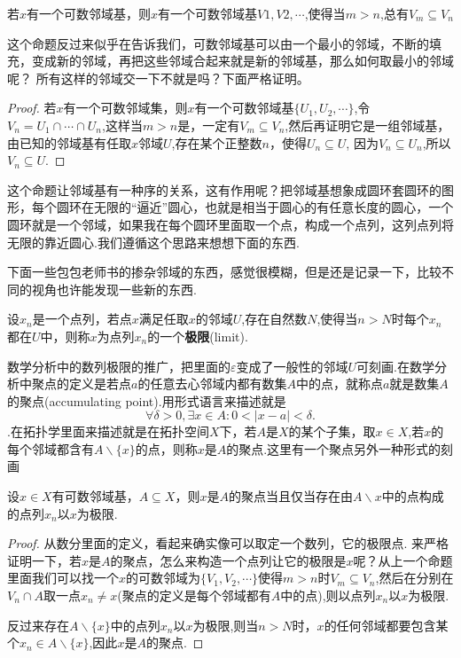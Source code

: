 \begin{proposition}
若$x$有一个可数邻域基，则$x$有一个可数邻域基${V1,V2,\cdots}$,使得当$m > n$,总有$V_m \subseteq V_n$
\end{proposition}

这个命题反过来似乎在告诉我们，可数邻域基可以由一个最小的邻域，不断的填充，变成新的邻域，再把这些邻域合起来就是新的邻域基，那么如何取最小的邻域呢？ 所有这样的邻域交一下不就是吗？下面严格证明。

\begin{proof}
若$x$有一个可数邻域集，则$x$有一个可数邻域基$\{U_1,U_2,\cdots\}$,令$V_n=U_1 \cap \cdots \cap U_n$,这样当$m>n$是，一定有$V_m \subseteq V_n$,然后再证明它是一组邻域基，由已知的邻域基有任取$x$邻域$U$,存在某个正整数$n$，使得$U_n \subseteq U$, 因为$V_n \subseteq U_n$,所以$V_n \subseteq U$.
\end{proof}

这个命题让邻域基有一种序的关系，这有作用呢？把邻域基想象成圆环套圆环的图形，每个圆环在无限的“逼近”圆心，也就是相当于圆心的有任意长度的圆心，一个圆环就是一个邻域，如果我在每个圆环里面取一个点，构成一个点列，这列点列将无限的靠近圆心.我们遵循这个思路来想想下面的东西.

下面一些包包老师书的掺杂邻域的东西，感觉很模糊，但是还是记录一下，比较不同的视角也许能发现一些新的东西.
\begin{definition}
设${x_n}$是一个点列，若点$x$满足任取$x$的邻域$U$,存在自然数$N$,使得当$n > N$时每个$x_n$都在$U$中，则称$x$为点列${x_n}$的一个\textbf{极限}(limit).
\end{definition}

数学分析中的数列极限的推广，把里面的$\varepsilon$变成了一般性的邻域$U$可刻画.在数学分析中聚点的定义是若点$a$的任意去心邻域内都有数集$A$中的点，就称点$a$就是数集$A$的聚点(accumulating point).用形式语言来描述就是\[\forall \delta > 0,\exists x \in A \colon 0 < |x-a| < \delta.\].在拓扑学里面来描述就是在拓扑空间$X$下，若$A$是$X$的某个子集，取$x \in X$,若$x$的每个邻域都含有$A \smallsetminus \{x\}$的点，则称$x$是$A$的聚点.这里有一个聚点另外一种形式的刻画

\begin{proposition}
设$x \in X$有可数邻域基，$A \subseteq X$，则$x$是$A$的聚点当且仅当存在由$A \smallsetminus {x}$中的点构成的点列${x_n}$以$x$为极限.
\end{proposition}

\begin{proof}
从数分里面的定义，看起来确实像可以取定一个数列，它的极限点. 来严格证明一下，若$x$是$A$的聚点，怎么来构造一个点列让它的极限是$x$呢？从上一个命题里面我们可以找一个$x$的可数邻域为$\{V_1,V_2,\cdots\}$使得$m > n$时$V_m \subseteq V_n$,然后在分别在$V_n \cap A$取一点$x_n \neq x$(聚点的定义是每个邻域都有$A$中的点),则以点列${x_n}$以$x$为极限.

反过来存在$A \smallsetminus \{x\}$中的点列${x_n}$以$x$为极限,则当$n >N$时，$x$的任何邻域都要包含某个$x_n \in A \smallsetminus \{x\}$,因此$x$是$A$的聚点.
\end{proof}

